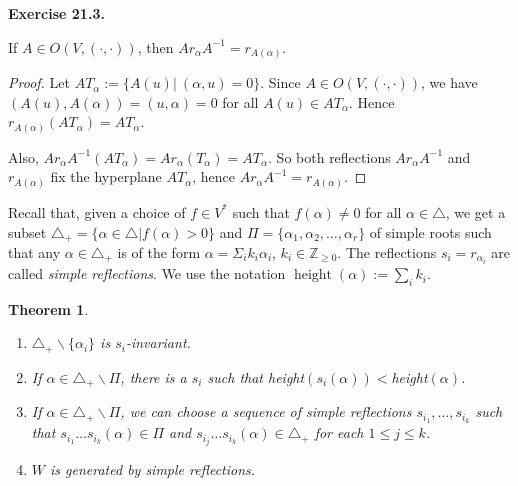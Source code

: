 \documentclass[10pt,twoside]{article}
\newtheorem{theorem}{Theorem}
\theoremstyle{definition}
\theoremstyle{remark}
\newcommand{\exercise}[1]{
	\vspace{9pt}\noindent
	{\bf Exercise #1.}
}
\begin{document}
\exercise{21.3}
 If $A\in O(V,(\cdot,\cdot))$, then $Ar_\alpha A^{-1}=r_{A(\alpha)}$.

\begin{proof}

Let $AT_\alpha :=\{A(u)| \ (\alpha,u)=0 \}$.  Since $A\in O(V,(\cdot,\cdot))$, we have $(A(u), A(\alpha))=(u,\alpha)=0$ for all $A(u)\in AT_\alpha$.  Hence $r_{A(\alpha)}(AT_\alpha)=AT_\alpha$.

Also, $Ar_\alpha A^{-1}(AT_\alpha)=Ar_\alpha (T_\alpha)=AT_\alpha$.  So both reflections $Ar_\alpha A^{-1}$ and $r_{A(\alpha)}$ fix the hyperplane $AT_\alpha$, hence $Ar_\alpha A^{-1}=r_{A(\alpha)}$.

\end{proof}


Recall that, given a choice of $f\in V^{*}$ such that
$f(\alpha)\neq 0$ for all $\alpha\in \triangle$, we get a subset
$\triangle_{+}=\{\alpha\in \triangle|f(\alpha)>0\}$ and
$\Pi=\{\alpha_{1},\alpha_{2},\ldots,\alpha_{r}\}$ of simple roots
such that any $\alpha\in \triangle_{+}$ is of the form
$\alpha=\Sigma_{i}k_{i}\alpha_{i}$, $k_{i}\in \mathbb{Z}_{\geq
0}$. The reflections $s_{i}=r_{\alpha_{i}}$ are called {\em simple
reflections}. We use the notation $\operatorname{height}(\alpha):=\sum_{i}k_{i}$.

\begin{theorem}\ 
\renewcommand{\labelenumi}{(\alph{enumi})}
\begin{enumerate}
\item $\triangle_{+}\backslash \{\alpha_{i}\}$ is
$s_{i}$-invariant.

\item If $\alpha\in \triangle_{+}\backslash \Pi$, there
is a $s_{i}$ such that height$(s_{i}(\alpha))<$height$(\alpha)$.

\item If $\alpha\in \triangle_{+}\backslash \Pi$, we can
choose a sequence of simple reflections
$s_{i_{1}},\ldots,s_{i_{k}}$ such that $s_{i_{1}}\ldots
s_{i_{k}}(\alpha)\in \Pi$ and $s_{i_{j}}\ldots
s_{i_{k}}(\alpha)\in \triangle_{+}$ for each $1\leq j\leq k$.

\item $W$ is generated by simple reflections.
\end{enumerate}

\end{theorem}
\end{document}
